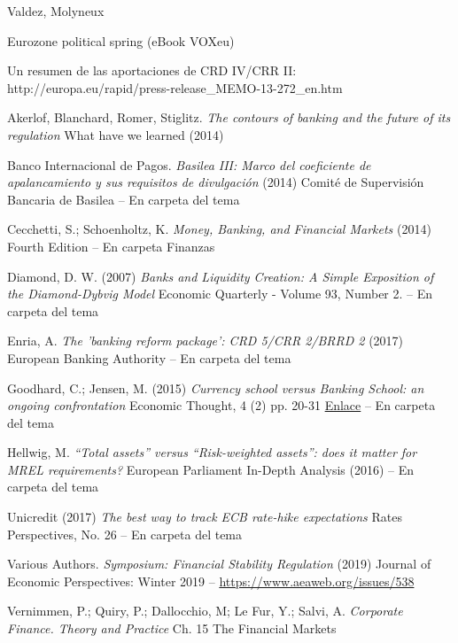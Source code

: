 \documentclass{nuevotema}
\begin{document}
Valdez, Molyneux

Eurozone political spring (eBook VOXeu)

Un resumen de las aportaciones de CRD IV/CRR II: http://europa.eu/rapid/press-release\_MEMO-13-272\_en.htm

Akerlof, Blanchard, Romer, Stiglitz. \textit{The contours of banking and the future of its regulation} What have we learned (2014)

Banco Internacional de Pagos. \textit{Basilea III: Marco del coeficiente de apalancamiento y sus requisitos de divulgación} (2014) Comité de Supervisión Bancaria de Basilea -- En carpeta del tema

Cecchetti, S.; Schoenholtz, K. \textit{Money, Banking, and Financial Markets} (2014) Fourth Edition -- En carpeta Finanzas

Diamond, D. W. (2007) \textit{Banks and Liquidity Creation: A Simple Exposition of the Diamond-Dybvig Model} Economic Quarterly - Volume 93, Number 2. -- En carpeta del tema 

Enria, A. \textit{The 'banking reform package': CRD 5/CRR 2/BRRD 2} (2017) European Banking Authority -- En carpeta del tema

Goodhard, C.; Jensen, M. (2015) \textit{Currency school versus Banking School: an ongoing confrontation} Economic Thought, 4 (2) pp. 20-31 \href{http://eprints.lse.ac.uk/64068/1/Currency\%20School\%20versus\%20Banking\%20School.pdf}{Enlace} -- En carpeta del tema

Hellwig, M. \textit{``Total assets'' versus ``Risk-weighted assets'': does it matter for MREL requirements?} European Parliament In-Depth Analysis (2016) -- En carpeta del tema

Unicredit (2017) \textit{The best way to track ECB rate-hike expectations} Rates Perspectives, No. 26 -- En carpeta del tema

Various Authors. \textit{Symposium: Financial Stability Regulation} (2019) Journal of Economic Perspectives: Winter 2019 -- \url{https://www.aeaweb.org/issues/538} 

Vernimmen, P.; Quiry, P.; Dallocchio, M; Le Fur, Y.; Salvi, A. \textit{Corporate Finance. Theory and Practice} Ch. 15 The Financial Markets
\end{document}
